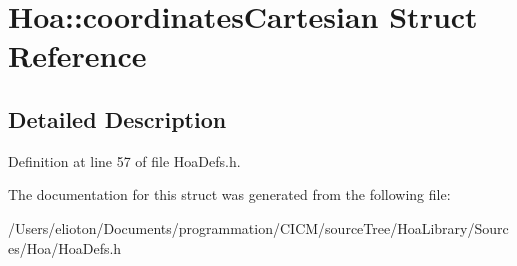 \hypertarget{struct_hoa_1_1coordinates_cartesian}{\section{Hoa\-:\-:coordinates\-Cartesian Struct Reference}
\label{struct_hoa_1_1coordinates_cartesian}
}


\subsection{Detailed Description}


Definition at line 57 of file Hoa\-Defs.\-h.



The documentation for this struct was generated from the following file\-:\begin{DoxyCompactItemize}
\item 
/\-Users/elioton/\-Documents/programmation/\-C\-I\-C\-M/source\-Tree/\-Hoa\-Library/\-Sources/\-Hoa/Hoa\-Defs.\-h\end{DoxyCompactItemize}
